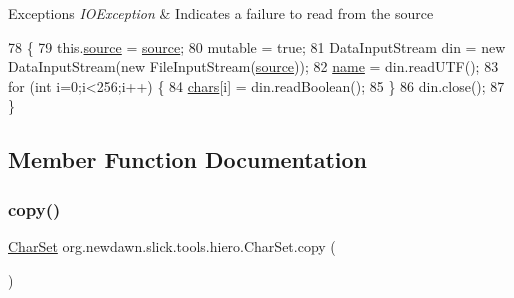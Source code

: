 \begin{DoxyExceptions}{Exceptions}
{\em I\+O\+Exception} & Indicates a failure to read from the source \\
\hline
\end{DoxyExceptions}

\begin{DoxyCode}
78                                                    \{
79         this.\mbox{\hyperlink{classorg_1_1newdawn_1_1slick_1_1tools_1_1hiero_1_1_char_set_a82b51d3f0bc57605405fde4608c44520}{source}} = \mbox{\hyperlink{classorg_1_1newdawn_1_1slick_1_1tools_1_1hiero_1_1_char_set_a82b51d3f0bc57605405fde4608c44520}{source}};
80         \textcolor{keyword}{mutable} = \textcolor{keyword}{true};
81         DataInputStream din = \textcolor{keyword}{new} DataInputStream(\textcolor{keyword}{new} FileInputStream(\mbox{\hyperlink{classorg_1_1newdawn_1_1slick_1_1tools_1_1hiero_1_1_char_set_a82b51d3f0bc57605405fde4608c44520}{source}}));
82         \mbox{\hyperlink{classorg_1_1newdawn_1_1slick_1_1tools_1_1hiero_1_1_char_set_aff26a369817bc815327582f0b7ac215e}{name}} = din.readUTF();
83         \textcolor{keywordflow}{for} (\textcolor{keywordtype}{int} i=0;i<256;i++) \{
84             \mbox{\hyperlink{classorg_1_1newdawn_1_1slick_1_1tools_1_1hiero_1_1_char_set_abc7c29b42b721d99a1cfc9d2ae97de07}{chars}}[i] = din.readBoolean();
85         \}
86         din.close();
87     \}
\end{DoxyCode}


\subsection{Member Function Documentation}
\mbox{\label{classorg_1_1newdawn_1_1slick_1_1tools_1_1hiero_1_1_char_set_ac7b36aa616329685e43d5fe25aca8f38}} 
\subsubsection{\texorpdfstring{copy()}{copy()}}
{\footnotesize\ttfamily \mbox{\hyperlink{classorg_1_1newdawn_1_1slick_1_1tools_1_1hiero_1_1_char_set}{Char\+Set}} org.\+newdawn.\+slick.\+tools.\+hiero.\+Char\+Set.\+copy (\begin{DoxyParamCaption}{ }\end{DoxyParamCaption})\hspace{0.3cm}{\ttfamily [inline]}}

